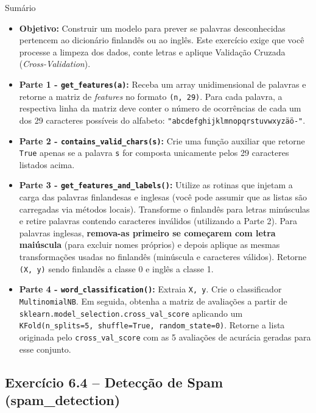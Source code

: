 \documentclass[11pt,a4paper]{article}
\begin{document}
\begin{exercicio}{Sumário}
\begin{itemize}
    \item \textbf{Objetivo:} Construir um modelo para prever se palavras desconhecidas pertencem ao dicionário finlandês ou ao inglês. Este exercício exige que você processe a limpeza dos dados, conte letras e aplique Validação Cruzada (\textit{Cross-Validation}).
    \item \textbf{Parte 1 - \texttt{get\_features(a)}:} Receba um array unidimensional de palavras e retorne a matriz de \emph{features} no formato \texttt{(n, 29)}. Para cada palavra, a respectiva linha da matriz deve conter o número de ocorrências de cada um dos 29 caracteres possíveis do alfabeto: \texttt{"abcdefghijklmnopqrstuvwxyzäö-"}.
    \item \textbf{Parte 2 - \texttt{contains\_valid\_chars(s)}:} Crie uma função auxiliar que retorne \texttt{True} apenas se a palavra \texttt{s} for composta unicamente pelos 29 caracteres listados acima.
    \item \textbf{Parte 3 - \texttt{get\_features\_and\_labels()}:} Utilize as rotinas que injetam a carga das palavras finlandesas e inglesas (você pode assumir que as listas são carregadas via métodos locais). Transforme o finlandês para letras minúsculas e retire palavras contendo caracteres inválidos (utilizando a Parte 2). Para palavras inglesas, \textbf{remova-as primeiro se começarem com letra maiúscula} (para excluir nomes próprios) e depois aplique as mesmas transformações usadas no finlandês (minúscula e caracteres válidos). Retorne \texttt{(X, y)} sendo finlandês a classe 0 e inglês a classe 1.
    \item \textbf{Parte 4 - \texttt{word\_classification()}:} Extraia \texttt{X, y}. Crie o classificador \texttt{MultinomialNB}. Em seguida, obtenha a matriz de avaliações a partir de \texttt{sklearn.model\_selection.cross\_val\_score} aplicando um \texttt{KFold(n\_splits=5, shuffle=True, random\_state=0)}. Retorne a lista originada pelo \texttt{cross\_val\_score} com as 5 avaliações de acurácia geradas para esse conjunto.
\end{itemize}
\end{exercicio}

\subsection*{Exercício 6.4 -- Detecção de Spam (spam\_detection)}
\end{document}
